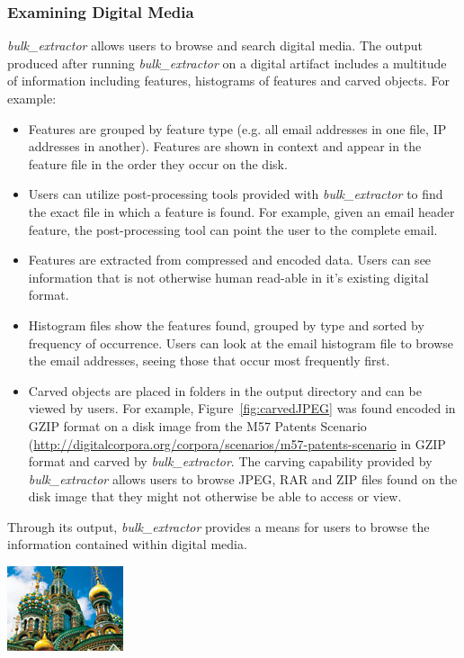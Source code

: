 \documentclass[DIV=calc, paper=a4, fontsize=11pt]{article}	 %
\newcommand \bulk {\textit{bulk\_extractor}\xspace}
\begin{document}
\subsubsection*{Examining Digital Media}
\bulk allows users to browse and search digital media. The output produced after running \bulk on a digital artifact includes a multitude of information including features, histograms of features and carved objects. For example:
\begin{itemize}
\item Features are grouped by feature type (e.g. all email addresses in one file, IP addresses in another). Features are shown in context and appear in the feature file in the order they occur on the disk. 
\item Users can utilize post-processing tools provided with \bulk to find the exact file in which a feature is found.  For example, given an email header feature, the post-processing tool can point the user to the complete email.
\item Features are extracted from compressed and encoded data. Users can see information that is not otherwise human read-able in it's existing digital format. 
\item Histogram files show the features found, grouped by type and sorted by frequency of occurrence. Users can look at the email histogram file to browse the email addresses, seeing those that occur most frequently first.
\item Carved objects are placed in folders in the output directory and can be viewed by users. For example, Figure~\ref{fig:carvedJPEG} was found encoded in GZIP format on a disk image from the M57 Patents Scenario (\url{http://digitalcorpora.org/corpora/scenarios/m57-patents-scenario} in GZIP format and carved by \bulk. The carving capability provided by \bulk allows users to browse JPEG, RAR and ZIP files found on the disk image that they might not otherwise be able to access or view.
\end{itemize}
Through its output, \bulk provides a means for users to browse the information contained within digital media.
\begin{center}
	\includegraphics[scale=.80]{carvedJPEG.jpg}
	\label{fig:carvedJPEG}
\end{center}
\end{document}
